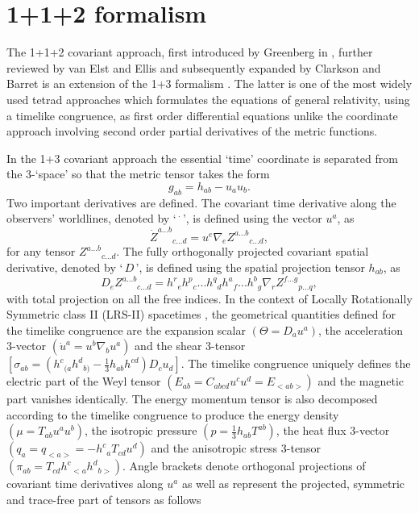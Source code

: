 \documentclass[abstract=on,notitlepage,superscriptaddress,nofootinbib,aps,preprint,prd]{revtex4}
\newcommand{\0}{^{(0)}}
\newcommand{\1}{^{(1)}}
\newcommand{\2}{^{(2)}}
\newcommand{\3}{{}^{(3)}}
\begin{document}
\section{1+1+2 formalism} \label{formalism}

The 1+1+2 covariant approach, first introduced by Greenberg in \cite{greenberg}, further reviewed by van Elst and Ellis  \cite{vanElstEllis}  and subsequently expanded by Clarkson and Barret  \cite{clarksonbarrett, clarkson2007} is an extension of the 1+3 formalism \cite{ehlers, ellis1+3}. The latter is one of the most widely used tetrad approaches which formulates the equations of general relativity, using a timelike congruence, as first order differential equations unlike the coordinate approach involving second order partial derivatives of the metric functions. 

In the 1+3 covariant approach the essential `time' coordinate is separated from the 3-`space' so that the metric tensor takes the form
\begin{equation}
g_{ab}=h_{ab}-u_au_b. \label{1+3}
\end{equation}
Two important derivatives are defined. The covariant time derivative along the observers' worldlines, denoted by `\,${^{\cdot}}$\,', is defined using the vector ${u^{a}}$, as
\begin{equation} 
\dot{Z}^{a ... b}{}_{c ... d} = u^{e}\nabla_{e} Z^{a ... b}{}_{c ... d},
\end{equation} 
for any tensor ${Z^{a...b}{}_{c...d}}$. The fully orthogonally projected covariant spatial derivative, denoted by `\,${D}$\,', is defined using the spatial projection tensor ${h_{ab}}$, as
\begin{equation}
D_{e} Z^{a...b}{}_{c...d} = h^r{}_{e} h^p{}_{c}... h^q{}_{d} h^a{}_{f}... h^b{}_{g}\nabla_{r} Z^{f...g}{}_{p...q},
\end{equation}
with total projection on all the free indices. 
In the context of Locally Rotationally Symmetric class II (LRS-II) spacetimes \cite{vanElstEllis}, the geometrical quantities defined for the timelike congruence are the expansion scalar $(\Theta = D_{a} u^{a} )$, the acceleration 3-vector $(\dot{u}^a = u^{b}\nabla_{b}u^a )$ and the shear 3-tensor $[\sigma_{ab} =  \left(h^{c}{}_{(a} h^{d}{}_{b)} - \frac{1}{3}h_{ab} h^{cd}\right)D_{c} u_{d}]$. The timelike congruence uniquely defines the electric part of the Weyl tensor $(E_{ab} = C_{abcd} u^{c} u^{d} = E_{<ab>})$ and the magnetic part vanishes identically. The energy momentum tensor is also decomposed according to the timelike congruence to produce the energy density $(\mu = T_{ab} u^{a} u^{b})$, the isotropic pressure $(p = \frac{1}{3} h_{ab} T^{ab})$, the heat flux 3-vector $(q_a = q_{<a>} = - h^{c}{}_{a} T_{cd} u^{d})$ and the anisotropic stress 3-tensor $(\pi_{ab} = T_{cd} h^c{}_{<a} h^d{}_{b>})$. Angle brackets denote orthogonal projections of covariant time derivatives along ${u^{a}}$ as well as represent the projected, symmetric and trace-free part of tensors as follows
\end{document}
